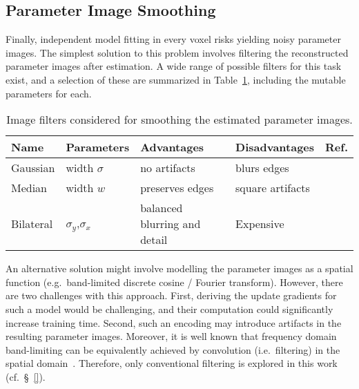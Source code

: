 \subsection{Parameter Image Smoothing}\label{ss:vlr-reg-smooth}
Finally, independent model fitting in every voxel risks yielding noisy parameter images.
The simplest solution to this problem involves
filtering the reconstructed parameter images after estimation.
A wide range of possible filters for this task exist,
and a selection of these are summarized in Table~\ref{tab:filters},
including the mutable parameters for each.
\begin{table}
  \centering
  \caption{Image filters considered for smoothing the estimated parameter images.}%
  \label{tab:filters}
  \begin{tabular}{llllc}
  	\toprule
  	Name      & Parameters            & Advantages                   & Disadvantages    &        Ref.         \\ \midrule
  	Gaussian  & width $\sigma$        & no artifacts                 & blurs edges      & \cite{Gonzalez2006} \\ %
  	Median    & width $w$             & preserves edges              & square artifacts & \cite{Gonzalez2006} \\ %
  	Bilateral & $\sigma_y$,$\sigma_x$ & balanced blurring and detail & Expensive        &  \cite{Tomasi1998}  \\ \bottomrule %
  \end{tabular}
\end{table}
\par
An alternative solution might involve modelling the parameter images as a spatial function
(e.g.\ band-limited discrete cosine / Fourier transform).
However, there are two challenges with this approach.
First, deriving the update gradients for such a model would be challenging,
and their computation could significantly increase training time.
Second, such an encoding may introduce artifacts in the resulting parameter images.
Moreover, it is well known that frequency domain band-limiting
can be equivalently achieved by convolution (i.e.\ filtering)
in the spatial domain~\cite{Gonzalez2006}.
Therefore, only conventional filtering is explored in this work (cf.~\S~\ref{}).

